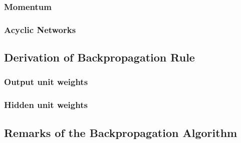 \documentclass{article}
\begin{document}
\subsubsection{Momentum}
\subsubsection{Acyclic Networks}
\subsection{Derivation of Backpropagation Rule}
\subsubsection{Output unit weights}
\subsubsection{Hidden unit weights}
\subsection{Remarks of the Backpropagation Algorithm}
\end{document}
